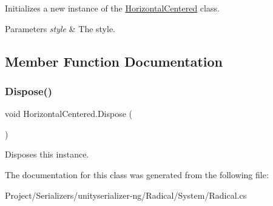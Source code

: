 Initializes a new instance of the \hyperlink{class_horizontal_centered}{Horizontal\+Centered} class. 


\begin{DoxyParams}{Parameters}
{\em style} & The style.\\
\hline
\end{DoxyParams}


\subsection{Member Function Documentation}
\mbox{\label{class_horizontal_centered_ae1df0c563467fff386f86b1e42115fb8}} 
\subsubsection{\texorpdfstring{Dispose()}{Dispose()}}
{\footnotesize\ttfamily void Horizontal\+Centered.\+Dispose (\begin{DoxyParamCaption}{ }\end{DoxyParamCaption})\hspace{0.3cm}{\ttfamily [inline]}}



Disposes this instance. 



The documentation for this class was generated from the following file\+:\begin{DoxyCompactItemize}
\item 
Project/\+Serializers/unityserializer-\/ng/\+Radical/\+System/Radical.\+cs\end{DoxyCompactItemize}
